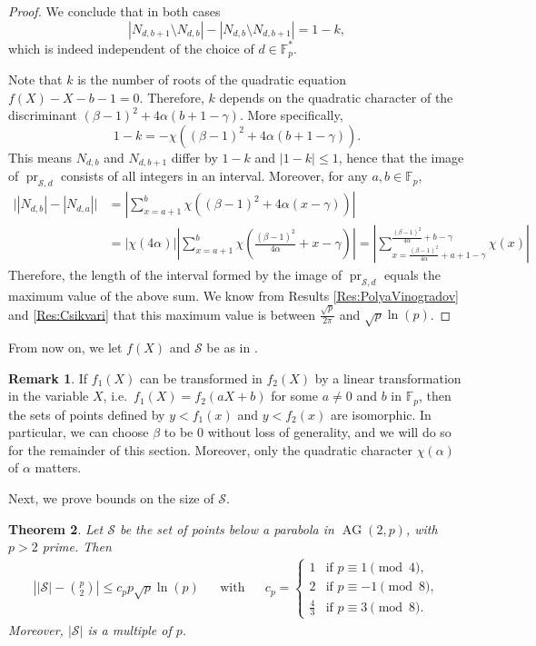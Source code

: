 \documentclass[a4paper, 12pt]{article}
\newtheorem{thm}{Theorem}[section]
\theoremstyle{definition}
\newtheorem{rmk}[thm]{Remark}
\newcommand{\FF}{\mathbb F}
\newcommand{\ms}{\mathcal S}
\DeclareMathOperator{\AG}{AG}
\newcommand{\ag}{\AG}
\DeclareMathOperator{\pr}{pr}
\begin{document}
\begin{proof}
 We conclude that in both cases
 \[
  |N_{d,b+1} \setminus N_{d,b}| - |N_{d,b} \setminus N_{d,b+1}| = 1-k,
 \]
 which is indeed independent of the choice of $d \in \FF_p^*$.

 Note that $k$ is the number of roots of the quadratic equation $f(X) - X - b - 1 = 0$.
 Therefore, $k$ depends on the quadratic character of the discriminant $(\beta-1)^2 + 4\alpha(b+1-\gamma)$.
 More specifically,
 \[
  1-k = -\chi( (\beta-1)^2 + 4\alpha(b+1-\gamma) ).
 \]
 This means $N_{d,b}$ and $N_{d,b+1}$ differ by $1-k$ and $|1-k| \leq 1$, hence that the image of $\pr_{\ms,d}$ consists of all integers in an interval.
 Moreover, for any $a,b \in \FF_p$,
 \begin{align*}
  \Big | |N_{d,b}| - |N_{d,a}| \Big |
  &= \left | \sum_{x = a+1}^b \chi( (\beta-1)^2 + 4\alpha(x-\gamma) ) \right| \\
  &= |\chi(4 \alpha)| \left | \sum_{x = a+1}^b \chi \left( \frac{(\beta-1)^2}{4\alpha} + x-\gamma \right) \right|
  = \left | \sum_{x = \frac{(\beta-1)^2}{4\alpha} + a+1-\gamma}^{\frac{(\beta-1)^2}{4\alpha} + b-\gamma} \chi \left( x \right) \right|
 \end{align*}
 Therefore, the length of the interval formed by the image of $\pr_{\ms,d}$ equals the maximum value of the above sum.
 We know from Results \ref{Res:PolyaVinogradov} and \ref{Res:Csikvari} that this maximum value is between $\frac{\sqrt p}{2 \pi}$ and $\sqrt p \ln(p)$.
\end{proof}

From now on, we let $f(X)$ and $\ms$ be as in .

\begin{rmk}
 \label{Rmk:Parabola}
 If $f_1(X)$ can be transformed in $f_2(X)$ by a linear transformation in the variable $X$, i.e.\ $f_1(X) = f_2(aX + b)$ for some $a\neq 0$ and $b$ in $\FF_p$, then the sets of points defined by $y < f_1(x)$ and $y < f_2(x)$ are isomorphic.
 In particular, we can choose $\beta$ to be $0$ without loss of generality, and we will do so for the remainder of this section.
 Moreover, only the quadratic character $\chi(\alpha)$ of $\alpha$ matters.
\end{rmk}

Next, we prove bounds on the size of $\ms$.

\begin{thm}
 \label{Thm:SizeS}
 Let $\ms$ be the set of points below a parabola in $\ag(2,p)$, with $p > 2$ prime.
 Then
 \begin{align*}
  \left||\ms| - \binom p 2\right| \leq c_p p \sqrt p \ln(p) && \text{with} &&
  c_p = \begin{cases}
   1 & \text{if } p \equiv 1 \pmod 4, \\
   2 & \text{if } p \equiv -1 \pmod 8, \\
   \frac43 & \text{if } p \equiv 3 \pmod 8.
  \end{cases}
 \end{align*}
 Moreover, $|\ms|$ is a multiple of $p$.
\end{thm}
\end{document}
